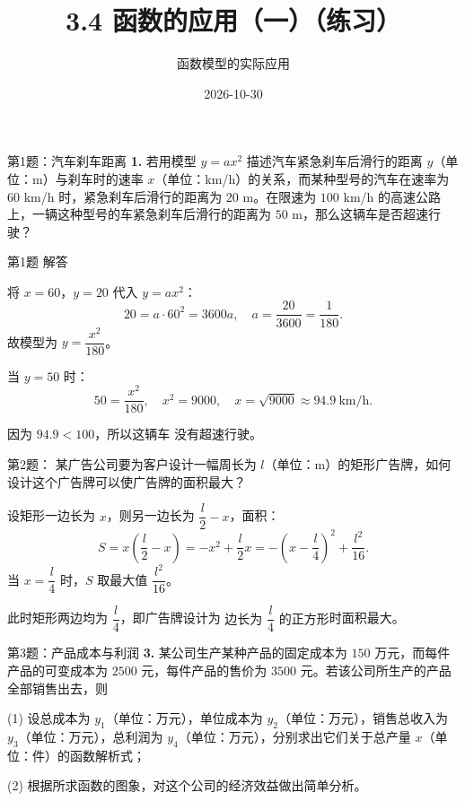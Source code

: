 \documentclass[10pt,aspectratio=169,serif,fleqn]{beamer}
\title[函数的应用(一)练习]{3.4 函数的应用（一）（练习）}
\subtitle{函数模型的实际应用}
\author{}
\institute{}
\date{2026-10-30}
\begin{document}
\begin{frame}
  \titlepage
\end{frame}

\begin{frame}[t]{第1题：汽车刹车距离}
\textbf{1.} 若用模型 $y=ax^2$ 描述汽车紧急刹车后滑行的距离 $y$（单位：m）与刹车时的速率 $x$（单位：km/h）的关系，而某种型号的汽车在速率为 $60$ km/h 时，紧急刹车后滑行的距离为 $20$ m。在限速为 $100$ km/h 的高速公路上，一辆这种型号的车紧急刹车后滑行的距离为 $50$ m，那么这辆车是否超速行驶？
\end{frame}

\begin{frame}[t]{第1题 解答}
	\vspace{-2em}
\begin{tcolorbox}[colback=orange!10,colframe=orange,title=\textbf{解}]
将 $x=60$，$y=20$ 代入 $y=ax^2$：
\[
20=a\cdot 60^2=3600a,\quad a=\frac{20}{3600}=\frac1{180}.
\]
故模型为 $y=\dfrac{x^2}{180}$。

\vspace{0.5em}
当 $y=50$ 时：
\[
50=\frac{x^2}{180},\quad x^2=9000,\quad x=\sqrt{9000}\approx 94.9\ \text{km/h}.
\]

\vspace{0.5em}
因为 $94.9<100$，所以这辆车 \alert{没有超速}行驶。
\end{tcolorbox}
\end{frame}

\begin{frame}[t]{第2题： 某广告公司要为客户设计一幅周长为 $l$（单位：m）的矩形广告牌，如何设计这个广告牌可以使广告牌的面积最大？}


\vspace{-1em}
\begin{tcolorbox}[colback=orange!10,colframe=orange,title=\textbf{解}]
	设矩形一边长为 $x$，则另一边长为 $\dfrac{l}{2}-x$，面积：
	\[
	S=x\left(\frac{l}{2}-x\right)=-x^2+\frac{l}{2}x=-\left(x-\frac{l}{4}\right)^2+\frac{l^2}{16}.
	\]
	当 $x=\dfrac{l}{4}$ 时，$S$ 取最大值 $\dfrac{l^2}{16}$。
	
	\vspace{0.5em}
	此时矩形两边均为 $\dfrac{l}{4}$，即广告牌设计为 \alert{边长为 $\dfrac{l}{4}$ 的正方形}时面积最大。
\end{tcolorbox}
\end{frame}



\begin{frame}[t]{第3题：产品成本与利润}
\textbf{3.} 某公司生产某种产品的固定成本为 $150$ 万元，而每件产品的可变成本为 $2500$ 元，每件产品的售价为 $3500$ 元。若该公司所生产的产品全部销售出去，则

(1) 设总成本为 $y_1$（单位：万元），单位成本为 $y_2$（单位：万元），销售总收入为 $y_3$（单位：万元），总利润为 $y_4$（单位：万元），分别求出它们关于总产量 $x$（单位：件）的函数解析式；

(2) 根据所求函数的图象，对这个公司的经济效益做出简单分析。
\end{frame}
\end{document}

